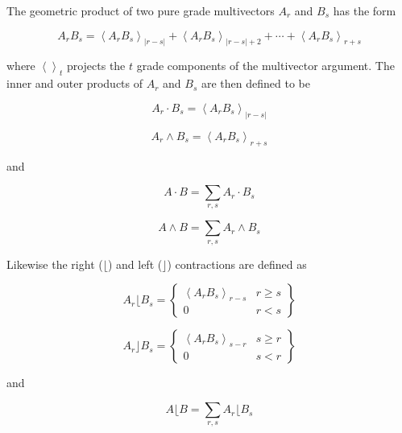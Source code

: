 \documentclass[10pt]{article}
\newcommand{\llt}{\left <}
\newcommand{\rgt}{\right >}
\newcommand{\abs}[1]{\left |{#1}\right |}
\newcommand{\proj}[2]{\llt {#1} \rgt_{#2}}
\begin{document}
The geometric product of two pure grade multivectors $A_{r}$ and
$B_{s}$ has the form

  \begin{equation}
  A_{r}B_{s} = \proj{A_{r}B_{s}}{\abs{r-s}}+\proj{A_{r}B_{s}}{\abs{r-s}+2}+\cdots+\proj{A_{r}B_{s}}{r+s}
  \end{equation}

where $\proj{}{t}$ projects the $t$ grade components of the
multivector argument.  The inner and outer products of $A_{r}$ and
$B_{s}$ are then defined to be

  \begin{equation}
  A_{r}\cdot B_{s} = \proj{A_{r}B_{s}}{\abs{r-s}}
  \end{equation}

  \begin{equation}
  A_{r}\wedge B_{s} = \proj{A_{r}B_{s}}{r+s}
  \end{equation}

and

  \begin{equation}
  A\cdot B = \sum_{r,s}A_{r}\cdot B_{s}
  \end{equation}

  \begin{equation}
  A\wedge B = \sum_{r,s}A_{r}\wedge B_{s}
  \end{equation}

Likewise the right ($\lfloor$) and left ($\rfloor$) contractions are defined as

  \begin{equation}
  A_{r}\lfloor B_{s} = \left \{ \begin{array}{cc}
     \proj{A_{r}B_{s}}{r-s} &  r \ge s \\
               0            &  r < s \end{array} \right \}
  \end{equation}

  \begin{equation}
  A_{r}\rfloor B_{s} = \left \{ \begin{array}{cc}
     \proj{A_{r}B_{s}}{s-r} &  s \ge r \\
               0            &  s < r \end{array} \right \}
  \end{equation}

and

  \begin{equation}
  A\lfloor B = \sum_{r,s}A_{r}\lfloor B_{s}
  \end{equation}
\end{document}
